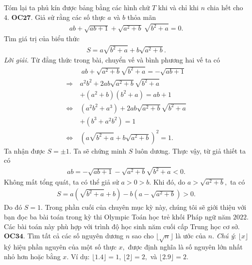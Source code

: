 \begin{multicols}{2}
\begin{figure}[H]
		\vspace*{-5pt}
	\end{figure}
	Tóm lại ta phủ kín được bảng bằng các hình chữ $T$ khi và chỉ khi $n$ chia hết cho $4$.
	\vskip 0.1cm
	{\bf\color{cackithi} OC$\pmb{27.}$} Giả sử rằng các số thực $a$ và $b$ thỏa mãn
	\begin{align*}
		ab+ \sqrt{ab+1} +\sqrt{a^2+b}\ \sqrt{b^2+a}=0.
	\end{align*}
	Tìm giá trị của biểu thức
	\begin{align*}
		S=a\sqrt{b^2+a} + b\sqrt{a^2+b}.
	\end{align*}
	\textit{\textit{Lời giải}.} Từ đẳng thức trong bài, chuyển vế và bình phương hai vế ta có
	\begin{align*}
		& \ ab+ \sqrt{a^2+b} \sqrt{b^2+a} = -\sqrt{ab+1} \\
		\Rightarrow\  &	a^2b^2 + 2ab\sqrt{a^2+b} \sqrt{b^2+a} \\
		&+ (a^2+b)(b^2+a) = ab+1\\
		\Leftrightarrow\  &	(a^2b^2+a^3) + 2ab\sqrt{a^2+b} \sqrt{b^2+a} \\
		&+ (b^3+a^2b^2) = 1\\
		\Leftrightarrow\ 	& (a\sqrt{b^2+a} + b\sqrt{a^2+b})^2 = 1.
	\end{align*}
	Ta nhận được $S=\pm 1.$ Ta sẽ chứng minh $S$ luôn dương. Thực vậy, từ giả thiết ta có
	\begin{align*}
		ab= -\sqrt{ab+1} -\sqrt{a^2+b} \sqrt{b^2+a} <0.
	\end{align*}
	Không mất tổng quát, ta có thể giả sử \linebreak $a>0>b.$ Khi đó, do $a>\sqrt{a^2+b},$ ta có
	\begin{align*}
		S= a( \sqrt{b^2+a} +b)- b(a- \sqrt{a^2+b})>0.
	\end{align*} 
	Do đó  $S=1$.
	\vskip 0.1cm
	Trong phần cuối của chuyên mục kỳ này, chúng tôi sẽ giới thiệu với bạn đọc ba bài toán trong kỳ thi Olympic Toán học trẻ khối Pháp ngữ năm $2022$. Các bài toán này phù hợp với trình độ học sinh năm cuối cấp Trung học cơ sở.
	\vskip 0.1cm
	{\bf\color{cackithi} OC$\pmb{34.}$} Tìm tất cả các số nguyên dương $n$ sao cho $ \lfloor \sqrt{n}\rfloor $ là ước của $n.$ 
	\vskip 0.1cm
	\textit{Chú ý}: $ \lfloor x \rfloor $ ký hiệu phần nguyên của một số thực $x,$ được định nghĩa là số nguyên lớn nhất nhỏ hơn hoặc bằng $x.$ Ví dụ: $ \lfloor 1.4 \rfloor =1$, $ \lfloor 2 \rfloor=2,$ và  $ \lfloor 2.9 \rfloor= 2.$  

\end{multicols}

